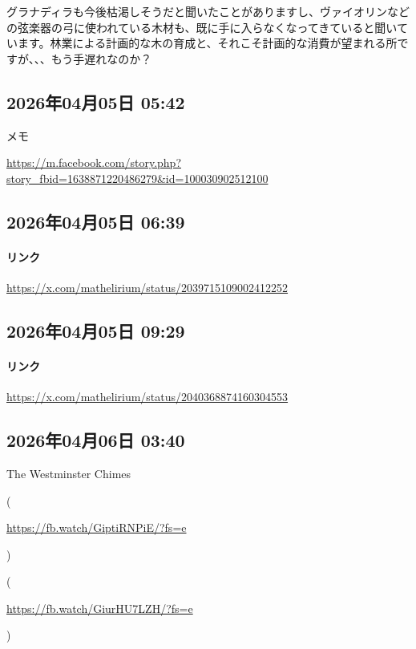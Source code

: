 \documentclass[facebook_diary.tex]{subfiles}
\begin{document}
グラナディラも今後枯渇しそうだと聞いたことがありますし、ヴァイオリンなどの弦楽器の弓に使われている木材も、既に手に入らなくなってきていると聞いています。林業による計画的な木の育成と、それこそ計画的な消費が望まれる所ですが、、、もう手遅れなのか？

\subsection*{2026年04月05日 05:42}

メモ


\url{https://m.facebook.com/story.php?story_fbid=1638871220486279&id=100030902512100}



\subsection*{2026年04月05日 06:39}

\paragraph{リンク}
\url{https://x.com/mathelirium/status/2039715109002412252}

\subsection*{2026年04月05日 09:29}

\paragraph{リンク}
\url{https://x.com/mathelirium/status/2040368874160304553}

\subsection*{2026年04月06日 03:40}

The Westminster Chimes

( 

\url{https://fb.watch/GiptiRNPiE/?fs=e}

 )

( 

\url{https://fb.watch/GiurHU7LZH/?fs=e}

 )
\end{document}
